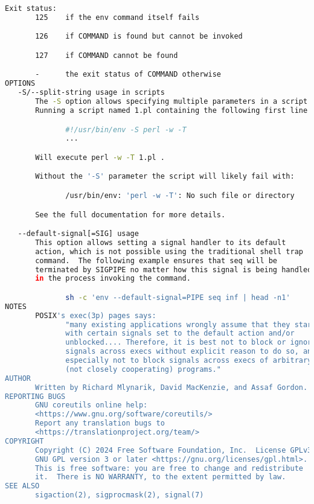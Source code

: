 {{\begin{lstlisting}[language=bash]
   Exit status:
       125    if the env command itself fails

       126    if COMMAND is found but cannot be invoked

       127    if COMMAND cannot be found

       -      the exit status of COMMAND otherwise
OPTIONS
   -S/--split-string usage in scripts
       The -S option allows specifying multiple parameters in a script.
       Running a script named 1.pl containing the following first line:

              #!/usr/bin/env -S perl -w -T
              ...

       Will execute perl -w -T 1.pl .

       Without the '-S' parameter the script will likely fail with:

              /usr/bin/env: 'perl -w -T': No such file or directory

       See the full documentation for more details.

   --default-signal[=SIG] usage
       This option allows setting a signal handler to its default
       action, which is not possible using the traditional shell trap
       command.  The following example ensures that seq will be
       terminated by SIGPIPE no matter how this signal is being handled
       in the process invoking the command.

              sh -c 'env --default-signal=PIPE seq inf | head -n1'
NOTES
       POSIX's exec(3p) pages says:
              "many existing applications wrongly assume that they start
              with certain signals set to the default action and/or
              unblocked.... Therefore, it is best not to block or ignore
              signals across execs without explicit reason to do so, and
              especially not to block signals across execs of arbitrary
              (not closely cooperating) programs."
AUTHOR
       Written by Richard Mlynarik, David MacKenzie, and Assaf Gordon.
REPORTING BUGS
       GNU coreutils online help:
       <https://www.gnu.org/software/coreutils/>
       Report any translation bugs to
       <https://translationproject.org/team/>
COPYRIGHT
       Copyright (C) 2024 Free Software Foundation, Inc.  License GPLv3+:
       GNU GPL version 3 or later <https://gnu.org/licenses/gpl.html>.
       This is free software: you are free to change and redistribute
       it.  There is NO WARRANTY, to the extent permitted by law.
SEE ALSO
       sigaction(2), sigprocmask(2), signal(7)


\end{lstlisting}}}

